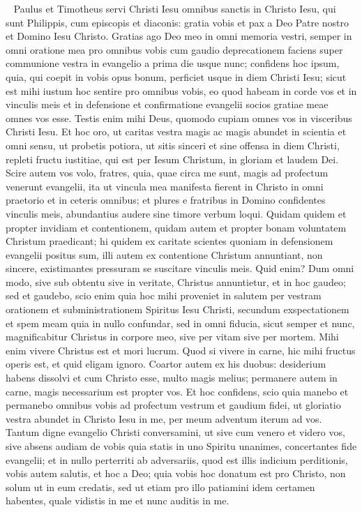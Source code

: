 
\begin{biblechapter}   
\verse Paulus et Timotheus servi Christi Iesu omnibus sanctis in Christo Iesu, qui sunt Philippis, cum episcopis et diaconis: 
\verse gratia vobis et pax a Deo Patre nostro et Domino Iesu Christo. 
\verse Gratias ago Deo meo in omni memoria vestri, 
\verse semper in omni oratione mea pro omnibus vobis cum gaudio deprecationem faciens 
\verse super communione vestra in evangelio a prima die usque nunc; 
\verse confidens hoc ipsum, quia, qui coepit in vobis opus bonum, perficiet usque in diem Christi Iesu; 
\verse sicut est mihi iustum hoc sentire pro omnibus vobis, eo quod habeam in corde vos et in vinculis meis et in defensione et confirmatione evangelii socios gratiae meae omnes vos esse. 
\verse Testis enim mihi Deus, quomodo cupiam omnes vos in visceribus Christi Iesu.  
\verse Et hoc oro, ut caritas vestra magis ac magis abundet in scientia et omni sensu, 
\verse ut probetis potiora, ut sitis sinceri et sine offensa in diem Christi, 
\verse repleti fructu iustitiae, qui est per Iesum Christum, in gloriam et laudem Dei. 
\verse Scire autem vos volo, fratres, quia, quae circa me sunt, magis ad profectum venerunt evangelii, 
\verse ita ut vincula mea manifesta fierent in Christo in omni praetorio et in ceteris omnibus; 
\verse et plures e fratribus in Domino confidentes vinculis meis, abundantius audere sine timore verbum loqui. 
\verse Quidam quidem et propter invidiam et contentionem, quidam autem et propter bonam voluntatem Christum praedicant; 
\verse hi quidem ex caritate scientes quoniam in defensionem evangelii positus sum, 
\verse illi autem ex contentione Christum annuntiant, non sincere, existimantes pressuram se suscitare vinculis meis.  
\verse Quid enim? Dum omni modo, sive sub obtentu sive in veritate, Christus annuntietur, et in hoc gaudeo; sed et gaudebo, 
\verse scio enim quia hoc mihi proveniet in salutem per vestram orationem et subministrationem Spiritus Iesu Christi, 
\verse secundum exspectationem et spem meam quia in nullo confundar, sed in omni fiducia, sicut semper et nunc, magnificabitur Christus in corpore meo, sive per vitam sive per mortem. 
\verse Mihi enim vivere Christus est et mori lucrum. 
\verse Quod si vivere in carne, hic mihi fructus operis est, et quid eligam ignoro. 
\verse Coartor autem ex his duobus: desiderium habens dissolvi et cum Christo esse, multo magis melius;  
\verse permanere autem in carne, magis necessarium est propter vos. 
\verse Et hoc confidens, scio quia manebo et permanebo omnibus vobis ad profectum vestrum et gaudium fidei, 
\verse ut gloriatio vestra abundet in Christo Iesu in me, per meum adventum iterum ad vos. 
\verse Tantum digne evangelio Christi conversamini, ut sive cum venero et videro vos, sive absens audiam de vobis quia statis in uno Spiritu unanimes, concertantes fide evangelii; 
\verse et in nullo perterriti ab adversariis, quod est illis indicium perditionis, vobis autem salutis, et hoc a Deo; 
\verse quia vobis hoc donatum est pro Christo, non solum ut in eum credatis, sed ut etiam pro illo patiamini 
\verse idem certamen habentes, quale vidistis in me et nunc auditis in me. 
\end{biblechapter}

